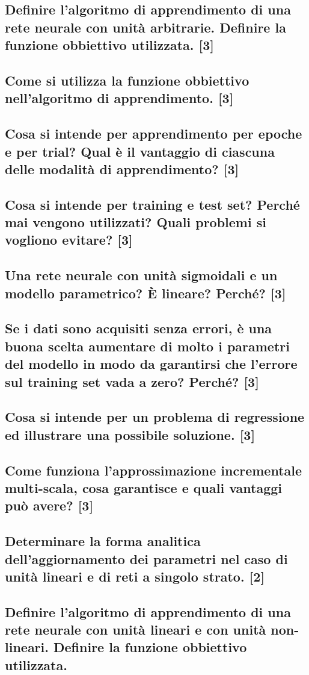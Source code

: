 \documentclass[\main/main.tex]{subfiles}
\begin{document}
\subsection{Definire l'algoritmo di apprendimento di una rete neurale con unità arbitrarie. Definire la funzione obbiettivo utilizzata. [3]}
\subsection{Come si utilizza la funzione obbiettivo nell'algoritmo di apprendimento. [3]}
\subsection{Cosa si intende per apprendimento per epoche e per trial? Qual è il vantaggio di ciascuna delle modalità di apprendimento? [3]}
\subsection{Cosa si intende per training e test set? Perché mai vengono utilizzati? Quali problemi si vogliono evitare? [3]}
\subsection{Una rete neurale con unità sigmoidali e un modello parametrico? È lineare? Perché? [3]}
\subsection{Se i dati sono acquisiti senza errori, è una buona scelta aumentare di molto i parametri del modello in modo da garantirsi che l'errore sul training set vada a zero? Perché? [3]}
\subsection{Cosa si intende per un problema di regressione ed illustrare una possibile soluzione. [3]}
\subsection{Come funziona l'approssimazione incrementale multi-scala, cosa garantisce e quali vantaggi può avere? [3]}
\subsection{Determinare la forma analitica dell'aggiornamento dei parametri nel caso di unità lineari e di reti a singolo strato. [2]}
\subsection{Definire l'algoritmo di apprendimento di una rete neurale con unità lineari e con unità non-lineari. Definire la funzione obbiettivo utilizzata.}
\end{document}
